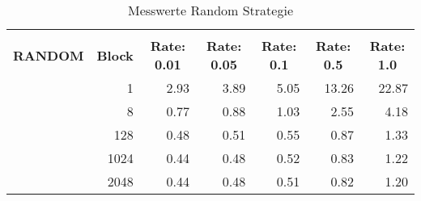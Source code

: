 \begin{table}[!htb]

\begin{tabular}{rrrrrrr}
\hline\\
\multicolumn{0}{c}{\colorbox{myblue}{\textbf{RANDOM}}} &  
\multicolumn{0}{c}{\colorbox{myblue}{\textbf{Block}}} &  
\multicolumn{0}{c}{\colorbox{myblue}{\textbf{Rate: 0.01}}} &  
\multicolumn{0}{c}{\colorbox{myblue}{\textbf{Rate: 0.05}}} & 
\multicolumn{0}{c}{\colorbox{myblue}{\textbf{Rate: 0.1}}} &
\multicolumn{0}{c}{\colorbox{myblue}{\textbf{Rate: 0.5}}} & 
\multicolumn{0}{c}{\colorbox{myblue}{\textbf{Rate: 1.0}}}\\
 & 1 & 2.93 & 3.89 & 5.05 & 13.26 & 22.87 \\
 & 8 & 0.77 & 0.88 & 1.03 & 2.55 & 4.18 \\
 & 128 & 0.48 & 0.51 & 0.55 & 0.87 & 1.33 \\ 
 & 1024 & 0.44 & 0.48 & 0.52 & 0.83 & 1.22 \\
 & 2048 & 0.44 & 0.48 & 0.51 & 0.82 & 1.20 \\
\hline
\end{tabular}
\caption{Messwerte Random Strategie}
\label{tblRandom}
\end{table}


